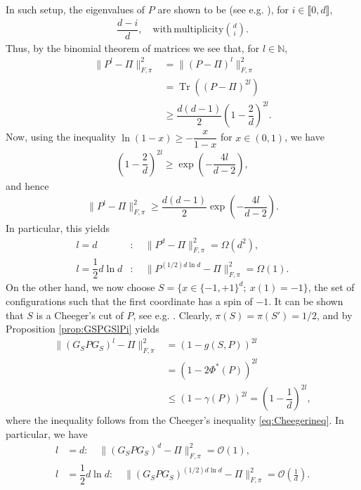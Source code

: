 \documentclass[EJP]{ejpecp} %
\DeclareMathOperator{\Tr}{Tr}
\begin{document}
In such setup, the eigenvalues of $P$ are shown to be (see e.g. \cite[Lemma $5.2.17$]{roch_mdp_2024}), for $i \in \llbracket 0,d \rrbracket$,
\begin{align*}
    \dfrac{d-i}{d}, \quad \mathrm{with \, multiplicity } \binom{d}{i}.
\end{align*}
Thus, by the binomial theorem of matrices we see that, for $l \in \mathbb{N}$,
\begin{align*}
    \|P^l - \Pi \|^2_{F,\pi} &= \|(P - \Pi)^l\|^2_{F,\pi} \\
                             &= \Tr((P - \Pi)^{2l}) \\
                             &\geq \dfrac{d(d-1)}{2} \left( 1 - \dfrac{2}{d} \right)^{2l}.
\end{align*}
Now, using the inequality $\ln(1-x) \geq - \dfrac{x}{1-x}$ for $x \in (0,1)$, we have
\begin{align*}
    \left( 1 - \dfrac{2}{d} \right)^{2l} \geq \exp\left(-\dfrac{4l}{d-2}\right),
\end{align*}
and hence
\begin{align*}
    \|P^l - \Pi \|^2_{F,\pi} \geq \dfrac{d(d-1)}{2} \exp\left(-\dfrac{4l}{d-2}\right).
\end{align*}
In particular, this yields
\begin{align}\label{eq:hypercubeP}
    l = d&:\quad \|P^d - \Pi \|^2_{F,\pi} = \Omega(d^2), \\
    l = \dfrac{1}{2}d \ln d&:\quad \|P^{(1/2)d\ln d} - \Pi \|^2_{F,\pi} = \Omega(1). \label{eq:hypercubeP2} 
\end{align}
On the other hand, we now choose $S = \{x \in \{-1,+1\}^d;~x(1) = -1\}$, the set of configurations such that the first coordinate has a spin of $-1$. It can be shown that $S$ is a Cheeger's cut of $P$, see e.g. \cite[Section $5.3.2$]{roch_mdp_2024}. Clearly, $\pi(S) = \pi(S') = 1/2$, and by Proposition \ref{prop:GSPGSlPi} yields
\begin{align*}
    \|(G_S P G_S)^l - \Pi \|^2_{F,\pi} &= (1-g(S,P))^{2l} \\
                                       &= (1-2\Phi^*(P))^{2l} \\
                                       &\leq (1 - \gamma(P))^{2l} = \left(1 - \dfrac{1}{d}\right)^{2l},
\end{align*}
where the inequality follows from the Cheeger's inequality \eqref{eq:Cheegerineq}. In particular, we have
\begin{align}\label{eq:hypercubeGPG}
    l &= d:\quad \|(G_S P G_S)^d - \Pi \|^2_{F,\pi} = \mathcal{O}(1), \\
    l &= \dfrac{1}{2}d \ln d:\quad \|(G_S P G_S)^{(1/2)d\ln d} - \Pi \|^2_{F,\pi} = \mathcal{O}\left(\frac{1}{d}\right). \label{eq:hypercubeGPG2}
\end{align}
\end{document}
